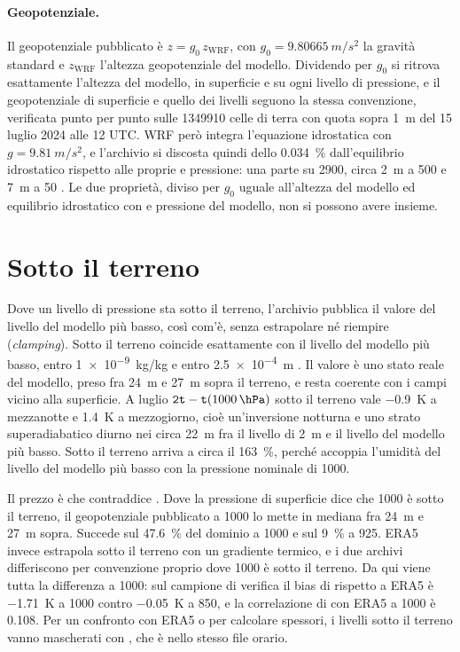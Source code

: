 \paragraph{Geopotenziale.} Il geopotenziale pubblicato è $z = g_0\, z_\text{WRF}$, con
$g_0 = \SI{9.80665}{m/s^2}$ la gravità standard e $z_\text{WRF}$ l'altezza geopotenziale del
modello. Dividendo  per $g_0$ si ritrova esattamente l'altezza del modello, in superficie
e su ogni livello di pressione, e il geopotenziale di superficie e quello dei livelli seguono la
stessa convenzione, verificata punto per punto sulle \num{1349910} celle di terra con quota sopra
\SI{1}{m} del 15 luglio 2024 alle 12 UTC. WRF però integra l'equazione idrostatica con
$g = \SI{9.81}{m/s^2}$, e l'archivio si discosta quindi dello \SI{0.034}{\percent} dall'equilibrio
idrostatico rispetto alle proprie  e pressione: una parte su \num{2900}, circa \SI{2}{m} a
\SI{500}{\hPa} e \SI{7}{m} a \SI{50}{\hPa} \parencite{issue39}. Le due proprietà,  diviso per $g_0$
uguale all'altezza del modello ed equilibrio idrostatico con  e pressione del modello, non
si possono avere insieme.

\section{Sotto il terreno}
\label{sec:sotto-terreno}

Dove un livello di pressione sta sotto il terreno, l'archivio pubblica il valore del livello del
modello più basso, così com'è, senza estrapolare né riempire (\emph{clamping}). Sotto il terreno
 coincide esattamente con il livello del modello più basso,  entro
\SI{1e-9}{kg/kg} e  entro \SI{2.5e-4}{m} \parencite{issue44}. Il valore è uno stato reale
del modello, preso fra \SI{24}{m} e \SI{27}{m} sopra il terreno, e resta coerente con i campi vicino alla superficie. A luglio
$\campo{2t} - \campo{t}(\SI{1000}{\hPa})$ sotto il terreno vale \SI{-0.9}{K} a mezzanotte e
\SI{+1.4}{K} a mezzogiorno, cioè un'inversione notturna e uno strato superadiabatico diurno nei circa
\SI{22}{m} fra il livello di \SI{2}{m} e il livello del modello più basso. Sotto il terreno
 arriva a circa il \SI{163}{\percent}, perché accoppia l'umidità del livello del modello
più basso con la pressione nominale di \SI{1000}{\hPa}.

Il prezzo è che  contraddice . Dove la pressione di superficie dice che
\SI{1000}{\hPa} è sotto il terreno, il geopotenziale pubblicato a \SI{1000}{\hPa} lo mette in mediana
fra \SI{24}{m} e \SI{27}{m} sopra. Succede sul \SI{47.6}{\percent} del dominio a \SI{1000}{\hPa} e sul
\SI{9}{\percent} a \SI{925}{\hPa}. ERA5 invece estrapola sotto il terreno con un gradiente termico,
e i due archivi differiscono per convenzione proprio dove \SI{1000}{\hPa} è sotto il terreno. Da qui
viene tutta la differenza a \SI{1000}{\hPa}: sul campione di verifica il bias di  rispetto a
ERA5 è \SI{-1.71}{K} a \SI{1000}{\hPa} contro \SI{-0.05}{K} a \SI{850}{\hPa}, e la correlazione di
 con ERA5 a \SI{1000}{\hPa} è \num{0.108}. Per un confronto con ERA5 o per calcolare spessori,
i livelli sotto il terreno vanno mascherati con , che è nello stesso file orario.

